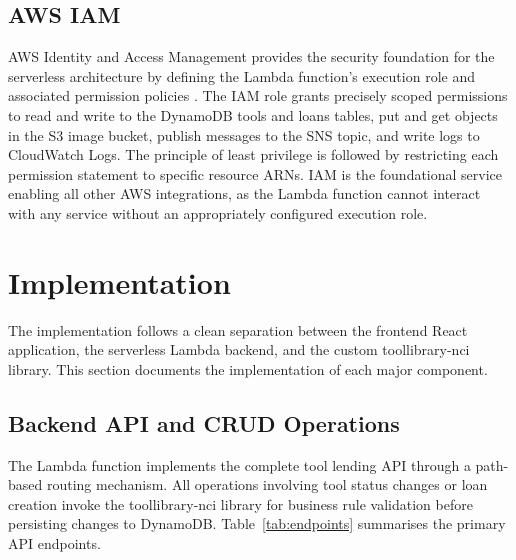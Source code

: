 \documentclass[conference]{IEEEtran}
\begin{document}
\subsection{AWS IAM}

AWS Identity and Access Management provides the security foundation for the serverless architecture by defining the Lambda function's execution role and associated permission policies \cite{awsiam}. The IAM role grants precisely scoped permissions to read and write to the DynamoDB tools and loans tables, put and get objects in the S3 image bucket, publish messages to the SNS topic, and write logs to CloudWatch Logs. The principle of least privilege is followed by restricting each permission statement to specific resource ARNs. IAM is the foundational service enabling all other AWS integrations, as the Lambda function cannot interact with any service without an appropriately configured execution role.

\section{Implementation}

The implementation follows a clean separation between the frontend React application, the serverless Lambda backend, and the custom toollibrary-nci library. This section documents the implementation of each major component.

\subsection{Backend API and CRUD Operations}

The Lambda function implements the complete tool lending API through a path-based routing mechanism. All operations involving tool status changes or loan creation invoke the toollibrary-nci library for business rule validation before persisting changes to DynamoDB. Table~\ref{tab:endpoints} summarises the primary API endpoints.
\end{document}
